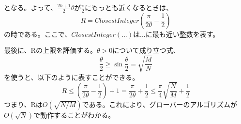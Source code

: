 
となる。よって、$\frac{2k + 1}{2}\theta$が$\frac{\pi}{2}$にもっとも近くなるときは、
\begin{equation}
    R = ClosestInteger(\frac{\pi}{2\theta} - \frac{1}{2})
\end{equation}
の時である。ここで、$ClosestInteger(...)$は$...$に最も近い整数を表す。

最後に、Rの上限を評価する。$\theta > 0$について成り立つ式、
\begin{equation}
    \frac{\theta}{2} \geq \sin{\frac{\theta}{2}} = \sqrt{\frac{M}{N}}
\end{equation}
を使うと、以下のように表すことができる。
\begin{equation}
    R \leq \left( \frac{\pi}{2\theta} - \frac{1}{2} \right) + 1 = \frac{\pi}{2\theta} + \frac{1}{2} \leq \frac{\pi}{4}\sqrt{\frac{N}{M}} + \frac{1}{2}
\end{equation}
つまり、Rは$O(\sqrt{N/M})$である。これにより、グローバーのアルゴリズムが$O(\sqrt{N})$で動作することがわかる\cite{QuantumDojo}。
